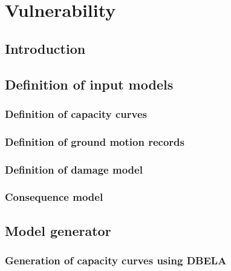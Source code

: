 \chapter{Vulnerability}
\label{chap:vulnerability}

    \section{Introduction}
    

    \section{Definition of input models}
    

		\subsection{Definition of capacity curves}
		\label{subsec:cap_curves}
		

		\subsection{Definition of ground motion records}
		\label{subsec:gmrs}
		

		\subsection{Definition of damage model}
		\label{subsec:dmg_model}
		

		\subsection{Consequence model}
		\label{subsec:cons_model}
		

	\section{Model generator}
	\label{sec:model-gen}
	

		\subsection{Generation of capacity curves using DBELA}
		\label{subsec:DBELA}
		


